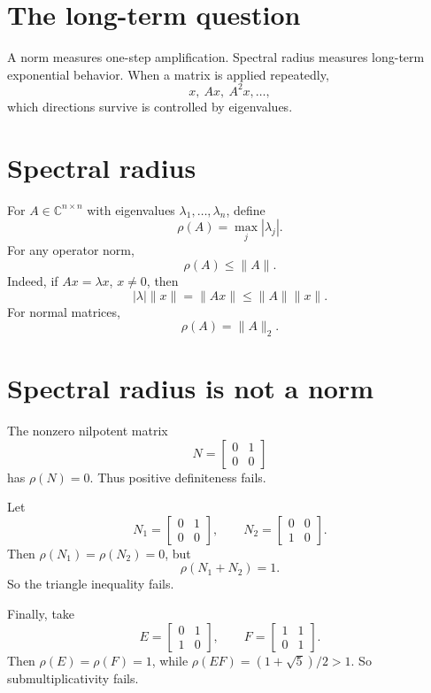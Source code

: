 
\section{The long-term question}

A norm measures one-step amplification.  Spectral radius measures long-term exponential behavior.  When a matrix is applied repeatedly,
\[
  x,\ Ax,\ A^2x,\ldots,
\]
which directions survive is controlled by eigenvalues.

\section{Spectral radius}

For \(A\in\mathbb C^{n\times n}\) with eigenvalues \(\lambda_1,\ldots,\lambda_n\), define
\[
  \rho(A)=\max_j |\lambda_j|.
\]
For any operator norm,
\[
  \rho(A)\le \|A\|.
\]
Indeed, if \(Ax=\lambda x\), \(x\ne0\), then
\[
  |\lambda|\|x\|=\|Ax\|\le \|A\|\|x\|.
\]
For normal matrices,
\[
  \rho(A)=\|A\|_2.
\]

\section{Spectral radius is not a norm}

The nonzero nilpotent matrix
\[
  N=\begin{bmatrix}0&1\\0&0\end{bmatrix}
\]
has \(\rho(N)=0\).  Thus positive definiteness fails.

Let
\[
  N_1=\begin{bmatrix}0&1\\0&0\end{bmatrix},\qquad
  N_2=\begin{bmatrix}0&0\\1&0\end{bmatrix}.
\]
Then \(\rho(N_1)=\rho(N_2)=0\), but
\[
  \rho(N_1+N_2)=1.
\]
So the triangle inequality fails.

Finally, take
\[
  E=\begin{bmatrix}0&1\\1&0\end{bmatrix},\qquad
  F=\begin{bmatrix}1&1\\0&1\end{bmatrix}.
\]
Then \(\rho(E)=\rho(F)=1\), while \(\rho(EF)=(1+\sqrt5)/2>1\).  So submultiplicativity fails.

